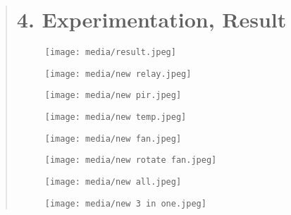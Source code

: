 \documentclass[12pt]{report}
\begin{document}
	\begin{quote}
		\section{4. Experimentation, Result}
		
		\begin{figure}
			\centering
							\hspace*{-1.4cm}
			\texttt{[image: media/result.jpeg]}\\
		\end{figure}
		\clearpage
		
		
		\begin{figure}
			\centering
							\hspace*{-1.5cm}
			\texttt{[image: media/new relay.jpeg]}\\
		\end{figure}
				\clearpage
				
		\begin{figure}
			\centering
							\hspace*{-1.5cm}
			\texttt{[image: media/new pir.jpeg]}\\
		\end{figure}
							\clearpage
					
		\begin{figure}
			\centering
							\hspace*{-1.5cm}
			\texttt{[image: media/new temp.jpeg]}\\
		\end{figure}
							\clearpage
					
		\begin{figure}
			\centering
							\hspace*{-1.5cm}
			\texttt{[image: media/new fan.jpeg]}\\
		\end{figure}
						\clearpage
				
		\begin{figure}
			\centering
							\hspace*{-1.5cm}
			\texttt{[image: media/new rotate fan.jpeg]}\\
		\end{figure}
		
		\begin{figure}
			\centering
			\hspace*{-0.3cm}
			\texttt{[image: media/new all.jpeg]}\\
			\end{figure}
			
		\begin{figure}
			\centering
			\hspace*{-1.5cm}
			\texttt{[image: media/new 3 in one.jpeg]}\\
			\end{figure}
				
	\end{quote}
	
\end{document}
